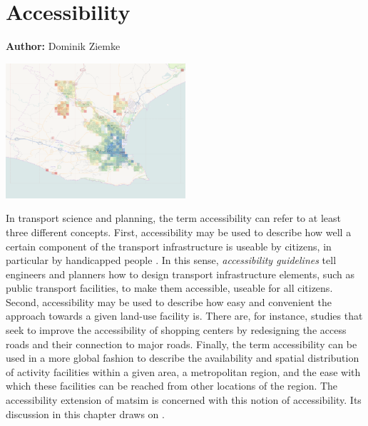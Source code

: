 \chapter{Accessibility}
\label{ch:accessibility}

\hfill \textbf{Author:} Dominik Ziemke

\begin{center} \includegraphics[width=0.5\textwidth, angle=0]{extending/figures/accessibility/w_freeSpeed_snapshot.png} \end{center}


In transport science and planning, the term accessibility can refer to at least three different concepts. 
First, accessibility may be used to describe how well a certain component of the transport infrastructure 
is useable by citizens, in particular by handicapped people \citep{Faura2012AccessibilityEvaluationTrafficSimulation}. 
In this sense, \emph{accessibility guidelines} tell engineers and planners how to design transport 
infrastructure elements, such as public transport facilities, to make them accessible, \ie useable 
for all citizens. Second, accessibility may be used to describe how easy and convenient the approach 
towards a given land-use facility is. There are, for instance, studies \citep{Fujiyama2004AccessibleDesignPTFacilities} 
that seek to improve the accessibility of shopping centers by redesigning the access roads and their 
connection to major roads. Finally, the term accessibility can be used in a more global fashion to 
describe the availability and spatial distribution of activity facilities within a given area, \eg a 
metropolitan region, and the ease with which these facilities can be reached from other locations of 
the region. The accessibility extension of \gls{matsim} is concerned with this notion of accessibility. 
Its discussion in this chapter draws on \citet{NicolaiNagelHiResAccessibilityMethod}.

